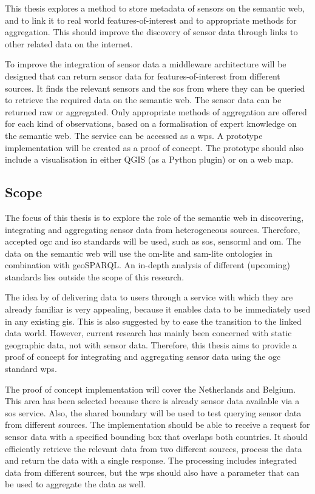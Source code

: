 This thesis explores a method to store metadata of sensors on the semantic web, and to link it to real world features-of-interest and to appropriate methods for aggregation. This should improve the discovery of sensor data through links to other related data on the internet.  

To improve the integration of sensor data a middleware architecture will be designed that can return sensor data for features-of-interest from different sources. It finds the relevant sensors and the \ac{sos} from where they can be queried to retrieve the required data on the semantic web. The sensor data can be returned raw or aggregated. Only appropriate methods of aggregation are offered for each kind of observations, based on a formalisation of expert knowledge on the semantic web. The service can be accessed as a \ac{wps}. A prototype implementation will be created as a proof of concept. The prototype should also include a visualisation in either QGIS (as a Python plugin) or on a web map. 

\subsection{Scope}
The focus of this thesis is to explore the role of the semantic web in discovering, integrating and aggregating sensor data from heterogeneous sources. Therefore, accepted \ac{ogc} and \ac{iso} standards will be used, such as \ac{sos}, \ac{sensorml} and \ac{om}. The data on the semantic web will use the om-lite and sam-lite ontologies in combination with geoSPARQL. An in-depth analysis of different (upcoming) standards lies outside the scope of this research. 

The idea by \cite{SW:Jones} of delivering data to users through a service with which they are already familiar is very appealing, because it enables data to be immediately used in any existing \ac{gis}. This is also suggested by \cite{SSW:Atkinson} to ease the transition to the linked data world. However, current research has mainly been concerned with static geographic data, not with sensor data. Therefore, this thesis aims to provide a proof of concept for integrating and aggregating sensor data using the \ac{ogc} standard \ac{wps}.

The proof of concept implementation will cover the Netherlands and Belgium. This area has been selected because there is already sensor data available via a \ac{sos} service. Also, the shared boundary will be used to test querying sensor data from different sources. The implementation should be able to receive a request for sensor data with a specified bounding box that overlaps both countries. It should efficiently retrieve the relevant data from two different sources, process the data and return the data with a single response. The processing includes integrated data from different sources, but the \ac{wps} should also have a parameter that can be used to aggregate the data as well.     






